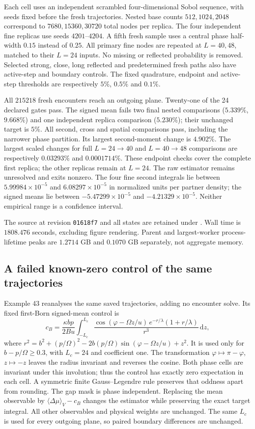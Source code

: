 \documentclass[11pt,letterpaper]{article}
\newcommand{\dd}{\mathrm d}
\begin{document}
Each cell uses an independent scrambled four-dimensional Sobol sequence,
with seeds fixed before the fresh trajectories. Nested base counts
$512,1024,2048$ correspond to $7680,15360,30720$ total nodes per replica.
The four independent fine replicas use seeds $4201$--$4204$. A fifth fresh
sample uses a central phase half-width $0.15$ instead of $0.25$.
All primary fine nodes are repeated at $L=40,48$, matched to their $L=24$
inputs. No missing or reflected probability is removed. Selected strong,
close, long reflected and predetermined fresh paths also have active-step
and boundary controls. The fixed quadrature, endpoint and active-step
thresholds are respectively $5\%$, $0.5\%$ and $0.1\%$.

All $215218$ fresh encounters reach an outgoing plane. Twenty-one of the
24 declared gates pass. The signed mean fails two final nested comparisons
($5.339\%$, $9.668\%$) and one independent replica comparison
($5.230\%$); their unchanged target is $5\%$. All second, cross and spatial
comparisons pass, including the narrower phase partition. Its largest
second-moment change is $4.902\%$. The largest scaled changes for full
$L=24\to40$ and $L=40\to48$ comparisons are respectively $0.03293\%$ and
$0.0001714\%$. These endpoint checks cover the complete first replica;
the other replicas remain at $L=24$. The raw estimator remains unresolved
and exits nonzero. The four fine second integrals lie between
$5.99984\times10^{-5}$ and $6.08297\times10^{-5}$ in normalized units per
partner density; the signed means lie between $-5.47299\times10^{-5}$ and
$-4.21329\times10^{-5}$. Neither empirical range is a confidence interval.

The source at revision \texttt{01618f7} and all states are retained under
. Wall time is $1808.476$ seconds,
excluding figure rendering. Parent and largest-worker process-lifetime
peaks are $1.2714$ GB and $0.1070$ GB separately, not aggregate memory.

\subsection*{A failed known-zero control of the same trajectories}
Example 43 reanalyses the same saved trajectories, adding no encounter
solve. Its fixed first-Born signed-mean control is
\[
 c_B=\frac{\kappa bp}{2Bu}\int_{-L_c}^{L_c}
 \frac{\cos(\varphi-\Omega z/u)\,e^{-r/\lambda}(1+r/\lambda)}{r^3}
 \,\dd z,
\]
where $r^2=b^2+(p/\Omega)^2-2b(p/\Omega)\sin(\varphi-\Omega z/u)+z^2$.
It is used only for $b-p/\Omega\geq0.3$, with $L_c=24$ and coefficient one.
The transformation $\varphi\mapsto\pi-\varphi$, $z\mapsto-z$ leaves the
radius invariant and reverses the cosine. Both phase cells are invariant
under this involution; thus the control has exactly zero expectation in
each cell. A symmetric finite Gauss--Legendre rule preserves that oddness
apart from rounding. The gap mask is phase independent. Replacing the mean
observable by $\langle\Delta\mu\rangle_V-c_B$ changes the estimator while
preserving the exact target integral. All other observables and physical
weights are unchanged. The same $L_c$ is used for every outgoing plane,
so paired boundary differences are unchanged.
\end{document}
